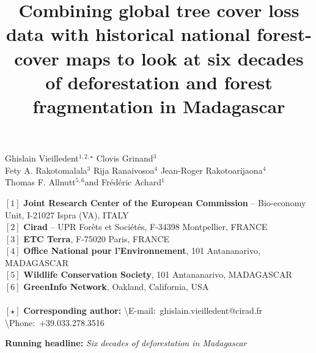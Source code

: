 \documentclass[a4paper, 12pt, leqno]{article} %
\title{Combining global tree cover loss data with historical national
  forest-cover maps to look at six decades of deforestation and forest
  fragmentation in Madagascar}
\date{}
\begin{document}
\maketitle

\vspace{-1cm}
\begin{center}
  Ghislain Vieilledent$^{1,2,\star}$\hspace{1cm}
  Clovis Grinand$^{3}$ \\
  \vspace{0.25cm}
  Fety A. Rakotomalala$^{3}$ \hspace{1cm}
  Rija Ranaivosoa$^{4}$ \hspace{1cm}
  Jean-Roger Rakotoarijaona$^{4}$ \\
  \vspace{0.25cm}
  Thomas F. Allnutt$^{5,6}$\hspace{1cm}and\hspace{1cm}
  Frédéric Achard$^{1}$
\end{center}

\vspace{0.3cm}

{\small
  \begin{flushleft}  
    $[1]$ \textbf{Joint Research Center of the European Commission} -- Bio-economy Unit, I-21027 Ispra (VA), ITALY\\
    $[2]$ \textbf{Cirad} -- UPR Forêts et Sociétés, F-34398 Montpellier, FRANCE\\
    $[3]$ \textbf{ETC Terra}, F-75020 Paris, FRANCE\\
    $[4]$ \textbf{Office National pour l'Environnement}, 101 Antananarivo, MADAGASCAR\\
    $[5]$ \textbf{Wildlife Conservation Society}, 101 Antananarivo, MADAGASCAR\\
    $[6]$ \textbf{GreenInfo Network}, Oakland, California, USA\\
    ~\\
    $[\star]$ \textbf{Corresponding author:}
    \textbackslash{E-mail}:~ghislain.vieilledent@cirad.fr
    \textbackslash{Phone}:~+39.033.278.3516\\
  \end{flushleft}}

\vspace{0.3cm}

\begin{center}
  \textbf{Running headline:} \emph{Six decades of deforestation in Madagascar}
\end{center}
\end{document}
